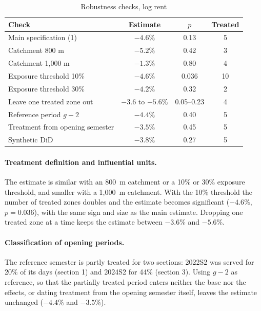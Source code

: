 \begin{table}[tbhp]
\centering
\caption{Robustness checks, log rent}
\label{tab:m4robust}
\begin{tabular}{lccc}
\hline
Check & Estimate & $p$ & Treated \\
\hline
Main specification (1) & $-4.6\%$ & 0.13 & 5 \\
Catchment 800 m & $-5.2\%$ & 0.42 & 3 \\
Catchment 1,000 m & $-1.3\%$ & 0.80 & 4 \\
Exposure threshold 10\% & $-4.6\%$ & 0.036 & 10 \\
Exposure threshold 30\% & $-4.2\%$ & 0.32 & 2 \\
Leave one treated zone out & $-3.6$ to $-5.6\%$ & 0.05--0.23 & 4 \\
Reference period $g-2$ & $-4.4\%$ & 0.40 & 5 \\
Treatment from opening semester & $-3.5\%$ & 0.45 & 5 \\
Synthetic DiD & $-3.8\%$ & 0.27 & 5 \\
\hline
\end{tabular}
\end{table}

\paragraph{Treatment definition and influential units.} The estimate is similar with an 800~m catchment or a 10\% or 30\% exposure threshold, and smaller with a 1,000~m catchment. With the 10\% threshold the number of treated zones doubles and the estimate becomes significant ($-4.6\%$, $p=0.036$), with the same sign and size as the main estimate. Dropping one treated zone at a time keeps the estimate between $-3.6\%$ and $-5.6\%$.

\paragraph{Classification of opening periods.} The reference semester is partly treated for two sections: 2022S2 was served for 20\% of its days (section 1) and 2024S2 for 44\% (section 3). Using $g-2$ as reference, so that the partially treated period enters neither the base nor the effects, or dating treatment from the opening semester itself, leaves the estimate unchanged ($-4.4\%$ and $-3.5\%$).

